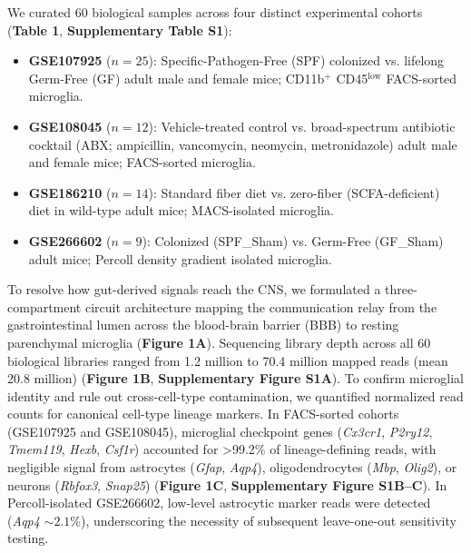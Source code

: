 \documentclass[10pt,a4paper]{article}
\begin{document}
We curated 60 biological samples across four distinct experimental cohorts (\textbf{Table 1}, \textbf{Supplementary Table S1}):
\begin{itemize}
\item \textbf{GSE107925} ($n=25$): Specific-Pathogen-Free (SPF) colonized vs. lifelong Germ-Free (GF) adult male and female mice; CD11b$^{+}$ CD45$^{\text{low}}$ FACS-sorted microglia\cite{thion2018_13}.
\item \textbf{GSE108045} ($n=12$): Vehicle-treated control vs. broad-spectrum antibiotic cocktail (ABX; ampicillin, vancomycin, neomycin, metronidazole) adult male and female mice; FACS-sorted microglia\cite{thion2018_13}.
\item \textbf{GSE186210} ($n=14$): Standard fiber diet vs. zero-fiber (SCFA-deficient) diet in wild-type adult mice; MACS-isolated microglia\cite{matt2023_21}.
\item \textbf{GSE266602} ($n=9$): Colonized (SPF\_Sham) vs. Germ-Free (GF\_Sham) adult mice; Percoll density gradient isolated microglia\cite{wang2024_22}.
\end{itemize}
To resolve how gut-derived signals reach the CNS, we formulated a three-compartment circuit architecture mapping the communication relay from the gastrointestinal lumen across the blood-brain barrier (BBB) to resting parenchymal microglia (\textbf{Figure 1A}). Sequencing library depth across all 60 biological libraries ranged from 1.2 million to 70.4 million mapped reads (mean 20.8 million) (\textbf{Figure 1B}, \textbf{Supplementary Figure S1A}). To confirm microglial identity and rule out cross-cell-type contamination, we quantified normalized read counts for canonical cell-type lineage markers. In FACS-sorted cohorts (GSE107925 and GSE108045), microglial checkpoint genes (\textit{Cx3cr1}, \textit{P2ry12}, \textit{Tmem119}, \textit{Hexb}, \textit{Csf1r}) accounted for >99.2\% of lineage-defining reads, with negligible signal from astrocytes (\textit{Gfap}, \textit{Aqp4}), oligodendrocytes (\textit{Mbp}, \textit{Olig2}), or neurons (\textit{Rbfox3}, \textit{Snap25}) (\textbf{Figure 1C}, \textbf{Supplementary Figure S1B--C}). In Percoll-isolated GSE266602, low-level astrocytic marker reads were detected (\textit{Aqp4} $\sim 2.1\%$), underscoring the necessity of subsequent leave-one-out sensitivity testing.
\end{document}
